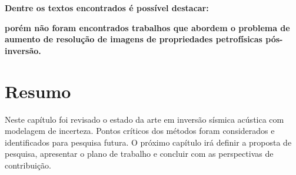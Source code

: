 \textbf{Dentre os textos encontrados é possível destacar:}

\textbf{porém não foram encontrados trabalhos que abordem o problema de aumento de resolução de imagens de propriedades petrofísicas
pós-inversão.}

\section{Resumo}

Neste capítulo foi revisado o estado da arte em inversão sísmica acústica
com modelagem de incerteza. Pontos críticos dos métodos foram considerados e
identificados para pesquisa futura. O próximo capítulo irá definir a proposta de
pesquisa, apresentar o plano de trabalho e concluir com as perspectivas de
contribuição.
